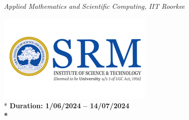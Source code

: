 \documentclass[a4paper,12pt]{report}
\begin{document}
\begin{center}
\textit{Applied Mathematics and Scientific Computing, IIT Roorkee}\\
\end{center}
\begin{center}
 \includegraphics[scale=2.3]{srm_logo.png}\\*
\Large\bfseries{Duration: 1/06/2024 – 14/07/2024 }\\*
\end{center}
\end{document}
